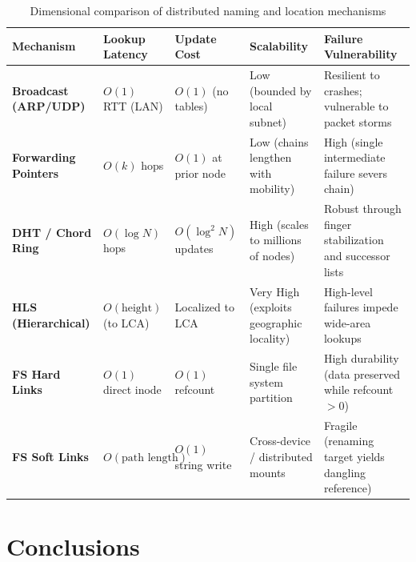 \documentclass[11pt,a4paper]{article}
\begin{document}
\begin{table}[H]
\centering
\caption{Dimensional comparison of distributed naming and location mechanisms}
\label{tab:comparison}
\footnotesize
\begin{tabular}{p{2.6cm}p{2.3cm}p{2.3cm}p{3.2cm}p{4.0cm}}
\toprule
\textbf{Mechanism} & \textbf{Lookup Latency} & \textbf{Update Cost} & \textbf{Scalability} & \textbf{Failure Vulnerability} \\
\midrule
\textbf{Broadcast (ARP/UDP)} & $O(1)$ RTT (LAN) & $O(1)$ (no tables) & Low (bounded by local subnet) & Resilient to crashes; vulnerable to packet storms \\
\addlinespace
\textbf{Forwarding Pointers} & $O(k)$ hops & $O(1)$ at prior node & Low (chains lengthen with mobility) & High (single intermediate failure severs chain) \\
\addlinespace
\textbf{DHT / Chord Ring} & $O(\log N)$ hops & $O(\log^2 N)$ updates & High (scales to millions of nodes) & Robust through finger stabilization and successor lists \\
\addlinespace
\textbf{HLS (Hierarchical)} & $O(\text{height})$ (to LCA) & Localized to LCA & Very High (exploits geographic locality) & High-level failures impede wide-area lookups \\
\addlinespace
\textbf{FS Hard Links} & $O(1)$ direct inode & $O(1)$ refcount & Single file system partition & High durability (data preserved while refcount $>0$) \\
\addlinespace
\textbf{FS Soft Links} & $O(\text{path length})$ & $O(1)$ string write & Cross-device / distributed mounts & Fragile (renaming target yields dangling reference) \\
\bottomrule
\end{tabular}
\end{table}

\section{Conclusions}
\end{document}
